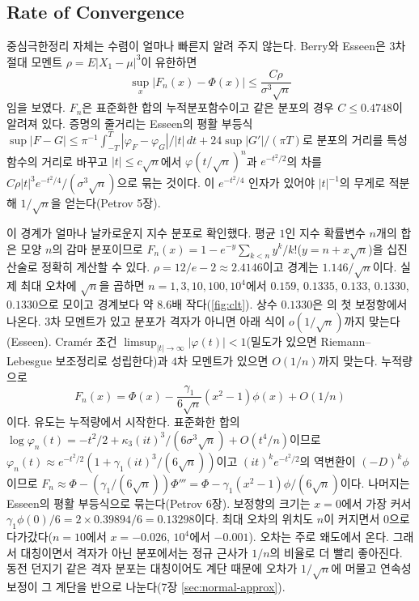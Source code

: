 \subsection{Rate of Convergence}

중심극한정리 자체는 수렴이 얼마나 빠른지 알려 주지 않는다. Berry\cite{berry1941}와 Esseen은 $3$차 절대 모멘트 $\rho=E|X_1-\mu|^3$이 유한하면
\[
\sup_x\bigl|F_n(x)-\Phi(x)\bigr|\le\frac{C\rho}{\sigma^3\sqrt n}
\]
임을 보였다. $F_n$은 표준화한 합의 누적분포함수이고 같은 분포의 경우 $C\le0.4748$이 알려져 있다\cite{shevtsova2011}. 증명의 줄거리는 Esseen의 평활 부등식 $\sup|F-G|\le\pi^{-1}\int_{-T}^T|\varphi_F-\varphi_G|/|t|\,dt+24\sup|G'|/(\pi T)$로 분포의 거리를 특성함수의 거리로 바꾸고 $|t|\le c\sqrt n$에서 $\varphi(t/\sqrt n)^n$과 $e^{-t^2/2}$의 차를 $C\rho|t|^3e^{-t^2/4}/(\sigma^3\sqrt n)$으로 묶는 것이다. 이 $e^{-t^2/4}$ 인자가 있어야 $|t|^{-1}$의 무게로 적분해 $1/\sqrt n$을 얻는다(Petrov\cite{petrov1975} 5장).

이 경계가 얼마나 날카로운지 지수 분포로 확인했다. 평균 $1$인 지수 확률변수 $n$개의 합은 모양 $n$의 감마 분포이므로 $F_n(x)=1-e^{-y}\sum_{k<n}y^k/k!$($y=n+x\sqrt n$)을 십진 산술로 정확히 계산할 수 있다. $\rho=12/e-2\approx2.4146$이고 경계는 $1.146/\sqrt n$이다. 실제 최대 오차에 $\sqrt n$을 곱하면 $n=1,3,10,100,10^4$에서 $0.159$, $0.1335$, $0.133$, $0.1330$, $0.1330$으로 모이고 경계보다 약 $8.6$배 작다(\cref{fig:clt}). 상수 $0.1330$은 의 첫 보정항에서 나온다. $3$차 모멘트가 있고 분포가 격자가 아니면 아래 식이 $o(1/\sqrt n)$까지 맞는다(Esseen\cite{esseen1945}). Cram\'er 조건 $\limsup_{|t|\to\infty}|\varphi(t)|<1$(밀도가 있으면 Riemann--Lebesgue 보조정리로 성립한다)과 $4$차 모멘트가 있으면 $O(1/n)$까지 맞는다. 누적량으로
\[
F_n(x)=\Phi(x)-\frac{\gamma_1}{6\sqrt n}(x^2-1)\phi(x)+O(1/n)
\]
이다. 유도는 누적량에서 시작한다. 표준화한 합의 $\log\varphi_n(t)=-t^2/2+\kappa_3(it)^3/(6\sigma^3\sqrt n)+O(t^4/n)$이므로 $\varphi_n(t)\approx e^{-t^2/2}(1+\gamma_1(it)^3/(6\sqrt n))$이고 $(it)^ke^{-t^2/2}$의 역변환이 $(-D)^k\phi$이므로 $F_n\approx\Phi-(\gamma_1/(6\sqrt n))\Phi'''=\Phi-\gamma_1(x^2-1)\phi/(6\sqrt n)$이다. 나머지는 Esseen의 평활 부등식으로 묶는다(Petrov\cite{petrov1975} 6장). 보정항의 크기는 $x=0$에서 가장 커서 $\gamma_1\phi(0)/6=2\times0.39894/6=0.13298$이다. 최대 오차의 위치도 $n$이 커지면서 $0$으로 다가갔다($n=10$에서 $x=-0.026$, $10^4$에서 $-0.001$). 오차는 주로 왜도에서 온다. 그래서 대칭이면서 격자가 아닌 분포에서는 정규 근사가 $1/n$의 비율로 더 빨리 좋아진다. 동전 던지기 같은 격자 분포는 대칭이어도 계단 때문에 오차가 $1/\sqrt n$에 머물고 연속성 보정이 그 계단을 반으로 나눈다(7장 \cref{sec:normal-approx}).

